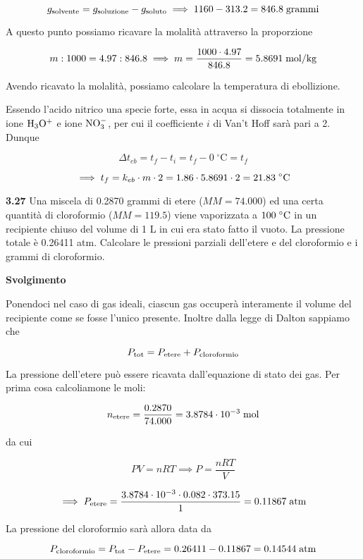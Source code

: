 $$g_{\rm solvente}=g_{\rm soluzione} - g_{\rm soluto}
\implies
1160 -313.2=846.8 \; \rm grammi$$

A questo punto possiamo ricavare la molalità attraverso la proporzione

$$m:1000=4.97:846.8
\implies
m=\frac{1000 \cdot 4.97}{846.8}=5.8691 \; \rm mol/kg$$

Avendo ricavato la molalità, possiamo calcolare la temperatura di ebollizione.

Essendo l'acido nitrico una specie forte, essa in acqua si dissocia totalmente in ione $\rm H_3O^+$ e ione $\rm NO_3^-$, per cui il coefficiente $i$ di Van't Hoff sarà pari a 2. Dunque

$$\Delta t_{eb}=t_f - t_i=t_f - 0 \; ^{\circ}\text{C}=t_f$$

$$\implies t_f
=k_{eb} \cdot m \cdot 2
=1.86 \cdot 5.8691 \cdot 2
=21.83 \; \rm ^{\circ}C$$

\vspace{0.2cm}\textbf{3.27} Una miscela di 0.2870 grammi di etere ($MM=74.000$) ed una certa quantità di cloroformio ($MM=119.5$) viene vaporizzata a $100 \; \rm ^{\circ} C$ in un recipiente chiuso del volume di 1 L in cui era stato fatto il vuoto. La pressione totale è 0.26411 atm. Calcolare le pressioni parziali dell'etere e del cloroformio e i grammi di cloroformio.

\vspace{0.2cm}\large\textbf{Svolgimento}\normalsize

\vspace{0.2cm}Ponendoci nel caso di gas ideali, ciascun gas occuperà interamente il volume del recipiente come se fosse l'unico presente. Inoltre dalla legge di Dalton sappiamo che

$$P_{\rm tot}=P_{\rm etere} + P_{\rm cloroformio}$$

La pressione dell'etere può essere ricavata dall'equazione di stato dei gas. Per prima cosa calcoliamone le moli:

$$n_{\rm etere}=\frac{0.2870}{74.000}
=3.8784 \cdot 10^{-3} \; \rm mol$$

da cui

$$PV=nRT 
\implies
P=\frac{nRT}{V}$$

$$\implies P_{\rm etere}
=\frac{3.8784 \cdot 10^{-3} \cdot 0.082 \cdot 373.15}{1}
=0.11867 \; \rm atm$$

La pressione del cloroformio sarà allora data da

$$P_{\rm cloroformio}
=P_{\rm tot} - P_{\rm etere}
=0.26411-0.11867
=0.14544 \; \rm atm$$

